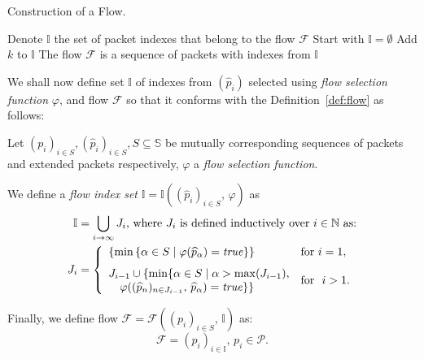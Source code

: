 \begin{algorithm}
    \caption{Construction of a Flow.}
    \label{alg:flow-construction}
    \begin{algorithmic}[1]
        \STATE Denote $\mathbb{I}$ the set of packet indexes that belong to the flow $\mathcal{F}$
        \STATE Start with $\mathbb{I} = \emptyset$
            \STATE Add $k$ to $\mathbb{I}$
        \ENDWHILE
        \STATE The flow $\mathcal{F}$ is a sequence of packets with indexes from $\mathbb{I}$
    \end{algorithmic}
\end{algorithm}

We shall now define set $\mathbb{I}$ of indexes from $(\widehat{p}_i)$ selected using \emph{flow selection function} $\varphi$, and flow $\mathcal{F}$ so that it conforms with the Definition~\ref{def:flow} as follows:
\begin{defn}\label{def:formal-flow}
Let $(p_i)_{i \in S}, (\widehat{p}_i)_{i \in S}, S \subseteq \mathbb{S}$ be %
mutually corresponding sequences of packets and extended packets respectively, $\varphi$ a \emph{flow selection function}.

We define a \emph{flow index set} $\mathbb{I} = \mathbb{I}\left((\widehat{p}_i)_{i \in S},\, \varphi\right)$ as 
\begin{align*}
\mathbb{I} &= \bigcup_{i \to \infty} J_i \text{, where } J_i \text{ is defined inductively over }i \in \mathbb{N} \text{ as:} \notag\\
J_i &= \left\{
    \begin{array}{ll}
        \left\{\min\left\{ \alpha \in S \mid \varphi(\widehat{p}_{\alpha}) = \mli{true} \right\}\right\} & \text{for } i = 1 , \\[0.7em]
        J_{i-1} \cup \{\min\{ \alpha \in S \mid \alpha > \max(J_{i-1}), & \multirow{2}{*}{\text{for } $i > 1$.} \\
        \quad \varphi((\widehat{p}_n)_{n\in J_{i-1}},\, \widehat{p}_{\alpha}) = \mli{true} \}\} &
    \end{array}\right.
\end{align*}

Finally, we define flow $\mathcal{F} = \mathcal{F}\left((p_i)_{i \in S},\, \mathbb{I}\right)$ as:
\begin{equation*}
    \mathcal{F} = (p_i)_{i \in \mathbb{I}},\, p_i \in \mathcal{P}.
\end{equation*}

\end{defn}

